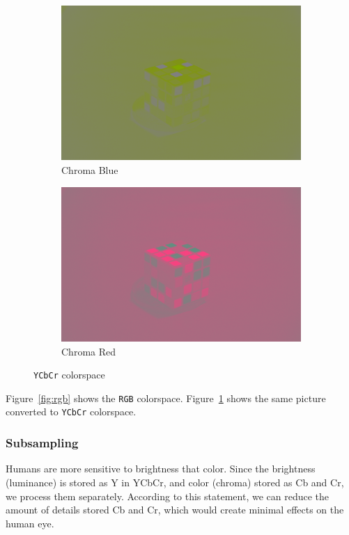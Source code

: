 \documentclass{article}
\begin{document}
\begin{figure}[h!]
\begin{subfigure}[b]{0.4\textwidth}
\begin{center}
	\includegraphics[width=\textwidth]{./implementation/experiment/Cb.png}
\end{center}
\caption{Chroma Blue}
\end{subfigure}
\begin{subfigure}[b]{0.4\textwidth}
\begin{center}
	\includegraphics[width=\textwidth]{./implementation/experiment/Cr.png}
\end{center}
\caption{Chroma Red}
\end{subfigure}
\caption{\texttt{YCbCr} colorspace}
\label{fig:ycbcr}
\end{figure}

Figure~\ref{fig:rgb} shows the \texttt{RGB} colorspace.
Figure~\ref{fig:ycbcr} shows the same picture converted to \texttt{YCbCr} colorspace.

\subsubsection{Subsampling}
Humans are more sensitive to brightness that color.
Since the brightness (luminance) is stored as Y in YCbCr, and color (chroma) stored as Cb and Cr, we process them separately.
According to this statement, we can reduce the amount of details stored Cb and Cr, which would create minimal effects on the human eye.
\end{document}
